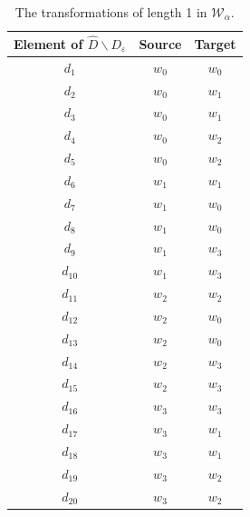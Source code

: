 \begin{table}[H]
	\centering
	\begin{tabular}{|c|c c|}
		\hline
		Element of $\hat{D} \backslash D_{\varepsilon}$ & Source  & Target  \\
		\hline
		$d_{1}$                                      & $w_{0}$ & $w_{0}$ \\
		$d_{2}$                                      & $w_{0}$ & $w_{1}$ \\
		$d_{3}$                                      & $w_{0}$ & $w_{1}$ \\
		$d_{4}$                                      & $w_{0}$ & $w_{2}$ \\
		$d_{5}$                                      & $w_{0}$ & $w_{2}$ \\
		$d_{6}$                                      & $w_{1}$ & $w_{1}$ \\
		$d_{7}$                                      & $w_{1}$ & $w_{0}$ \\
		$d_{8}$                                      & $w_{1}$ & $w_{0}$ \\
		$d_{9}$                                      & $w_{1}$ & $w_{3}$ \\
		$d_{10}$                                     & $w_{1}$ & $w_{3}$ \\
		$d_{11}$                                     & $w_{2}$ & $w_{2}$ \\
		$d_{12}$                                     & $w_{2}$ & $w_{0}$ \\
		$d_{13}$                                     & $w_{2}$ & $w_{0}$ \\
		$d_{14}$                                     & $w_{2}$ & $w_{3}$ \\
		$d_{15}$                                     & $w_{2}$ & $w_{3}$ \\
		$d_{16}$                                     & $w_{3}$ & $w_{3}$ \\
		$d_{17}$                                     & $w_{3}$ & $w_{1}$ \\
		$d_{18}$                                     & $w_{3}$ & $w_{1}$ \\
		$d_{19}$                                     & $w_{3}$ & $w_{2}$ \\
		$d_{20}$                                     & $w_{3}$ & $w_{2}$ \\
		\hline
	\end{tabular}
	\caption{The transformations of length 1 in $\mathscr{W}_{\alpha}$.}
	\label{tab:2x2_gridworld_length_1_transformations}
\end{table}

